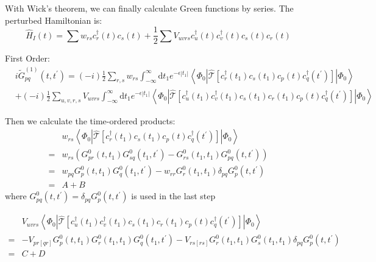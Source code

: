 With Wick's theorem, we can finally calculate Green functions by series.
The perturbed Hamiltonian is:
\begin{equation}
	\hat{H}_{I}(t)=\sum w_{r s} c_{r}^{\dagger}(t) c_{s}(t)+\frac{1}{2} \sum V_{u v r s} c_{u}^{\dagger}(t) c_{v}^{\dagger}(t) c_{s}(t) c_{r}(t)
\end{equation}

First Order:
\begin{equation}
	\begin{aligned}
		&i \tilde{G}_{p q}^{(1)}\left(t, t^{\prime}\right)=
		(-i) \frac{1}{2} \sum_{r, s} w_{r s} 
		\int_{-\infty}^{\infty} \mathrm{d} t_{1} e^{-\epsilon\left|t_{1}\right|}
		\left\langle\Phi_{0}\left|
		\hat{\mathcal{T}}\left[
			c_{r}^{\dagger}\left(t_{1}\right) 
			c_{s}\left(t_{1}\right) 
			c_{p}(t)
			c_{q}^{\dagger}\left(t^{\prime}\right)
			\right]
		\right| \Phi_{0}\right\rangle
	\\
		&+(-i) \frac{1}{2} \sum_{u, v, r, s} V_{u v r s} 
		\int_{-\infty}^{\infty} \mathrm{d} t_{1} e^{-\epsilon\left|t_{1}\right|}
		\left\langle\Phi_{0}\left|
		\hat{\mathcal{T}}\left[
			c_{u}^{\dagger}\left(t_{1}\right) 
			c_{v}^{\dagger}\left(t_{1}\right)
			c_{s}\left(t_{1}\right) 
			c_{r}\left(t_{1}\right)
			c_{p}(t)
			c_{q}^{\dagger}\left(t^{\prime}\right)
		\right]
		\right| \Phi_{0}\right\rangle
	\end{aligned}
\end{equation}

Then we calculate the time-ordered products:
\begin{equation}
	\begin{aligned}
		&w_{rs}
		\left\langle\Phi_{0}\left|
		\hat{\mathcal{T}}\left[
			c_{r}^{\dagger}\left(t_{1}\right) 
			c_{s}\left(t_{1}\right) 
			c_{p}(t)
			c_{q}^{\dagger}\left(t^{\prime}\right)
			\right]
		\right| \Phi_{0}\right\rangle
		\\
		=&w_{rs} (G^0_{pr}(t,t_1) G^0_{sq}(t_1,t^{\prime}) - G^0_{rs}(t_1,t_1) G^0_{pq}(t,t^{\prime}))
		\\
		=&w_{pq} G^0_p(t,t_1) G^0_q(t_1,t^{\prime}) - w_{rr} G^0_r(t_1,t_1) \delta_{pq} G^0_{p}(t,t^{\prime})
		\\
		=&A+B
	\end{aligned}
\end{equation}
where $G^0_{pq}(t,t^{\prime}) = \delta_{pq} G^0_{p}(t,t^{\prime})$ is used in the last step

\begin{equation}
	\begin{aligned}
		&V_{uvrs}
		\left\langle\Phi_{0}\left|
		\hat{\mathcal{T}}\left[
			c_{u}^{\dagger}\left(t_{1}\right) 
			c_{v}^{\dagger}\left(t_{1}\right)
			c_{s}\left(t_{1}\right) 
			c_{r}\left(t_{1}\right)
			c_{p}(t)
			c_{q}^{\dagger}\left(t^{\prime}\right)
		\right]
		\right| \Phi_{0}\right\rangle
		\\
		=& -V_{pr[qr]} G^0_{p}(t,t_1) G^0_{r}(t_1,t_1) G^0_{q}(t_1,t^{\prime})
		- V_{rs[rs]} G^0_r(t_1,t_1) G^0_s(t_1,t_1) \delta_{pq} G^0_p(t,t^{\prime})
		\\
		=&C+D
	\end{aligned}
\end{equation}

